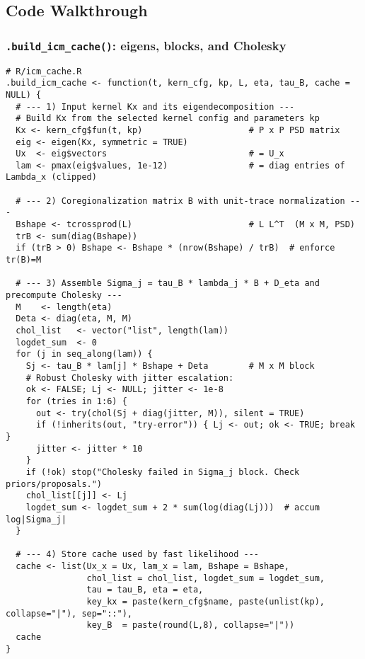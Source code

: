 \documentclass[11pt]{article}
\begin{document}
\subsection{Code Walkthrough}

\subsubsection{\texttt{.build\_icm\_cache()}: eigens, blocks, and Cholesky}

\begin{lstlisting}
# R/icm_cache.R
.build_icm_cache <- function(t, kern_cfg, kp, L, eta, tau_B, cache = NULL) {
  # --- 1) Input kernel Kx and its eigendecomposition ---
  # Build Kx from the selected kernel config and parameters kp
  Kx <- kern_cfg$fun(t, kp)                     # P x P PSD matrix
  eig <- eigen(Kx, symmetric = TRUE)
  Ux  <- eig$vectors                            # = U_x
  lam <- pmax(eig$values, 1e-12)                # = diag entries of Lambda_x (clipped)

  # --- 2) Coregionalization matrix B with unit-trace normalization ---
  Bshape <- tcrossprod(L)                       # L L^T  (M x M, PSD)
  trB <- sum(diag(Bshape))
  if (trB > 0) Bshape <- Bshape * (nrow(Bshape) / trB)  # enforce tr(B)=M

  # --- 3) Assemble Sigma_j = tau_B * lambda_j * B + D_eta and precompute Cholesky ---
  M    <- length(eta)
  Deta <- diag(eta, M, M)
  chol_list   <- vector("list", length(lam))
  logdet_sum  <- 0
  for (j in seq_along(lam)) {
    Sj <- tau_B * lam[j] * Bshape + Deta        # M x M block
    # Robust Cholesky with jitter escalation:
    ok <- FALSE; Lj <- NULL; jitter <- 1e-8
    for (tries in 1:6) {
      out <- try(chol(Sj + diag(jitter, M)), silent = TRUE)
      if (!inherits(out, "try-error")) { Lj <- out; ok <- TRUE; break }
      jitter <- jitter * 10
    }
    if (!ok) stop("Cholesky failed in Sigma_j block. Check priors/proposals.")
    chol_list[[j]] <- Lj
    logdet_sum <- logdet_sum + 2 * sum(log(diag(Lj)))  # accum log|Sigma_j|
  }

  # --- 4) Store cache used by fast likelihood ---
  cache <- list(Ux_x = Ux, lam_x = lam, Bshape = Bshape,
                chol_list = chol_list, logdet_sum = logdet_sum,
                tau = tau_B, eta = eta,
                key_kx = paste(kern_cfg$name, paste(unlist(kp), collapse="|"), sep="::"),
                key_B  = paste(round(L,8), collapse="|"))
  cache
}
\end{lstlisting}
\end{document}
